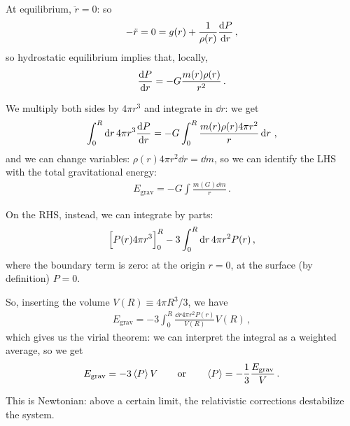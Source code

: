 \documentclass[main.tex]{subfiles}
\begin{document}
At equilibrium, \(\ddot{r} = 0\): so 
%
\begin{align}
  - \ddot{r} = 0 = g(r) + \frac{1}{\rho (r)} \dv{P}{r}
\,,
\end{align}
%
so hydrostatic equilibrium implies that, locally, 
%
\begin{align}
  \dv{P}{r} = - G \frac{m(r) \rho (r)}{r^2}
\,.
\end{align}
%

We multiply both sides by \(4 \pi r^3\) and integrate in \(\dd{r}\): we get 
%
\begin{align}
  \int_0^{R} \dd{r} 4 \pi r^3 \dv{P}{r} = 
  - G \int_{0}^{R} \frac{m(r) \rho (r) 4 \pi r^2}{r} \dd{r}
\,,
\end{align}
%
and we can change variables: \(\rho (r) 4 \pi r^2 \dd{r} = \dd{m }\), so we can identify the LHS with the total gravitational energy: 
%
\begin{align}
E _{\text{grav}} = -G \int \frac{m(G) \dd{m}}{r} 
\,. 
\end{align}

On the RHS, instead, we can integrate by parts: 
%
\begin{align}
  \qty[P(r) 4 \pi r^3]_0^{R} - 3 \int_{0}^{R} \dd{r} 4 \pi r^2 P(r)
\,,
\end{align}
%
where the boundary term is zero: at the origin \(r =0\), at the surface (by definition) \(P =0\).

So, inserting the volume \(V(R) \equiv 4 \pi R^3/3\), we have 
%
\begin{align}
  E _{\text{grav}} = - 3 \int_{0}^{R} \frac{ \dd{r} 4 \pi r^2   P(r)}{V(R)} V(R)
\,,
\end{align}
%
which gives us the virial theorem: we can interpret the integral as a weighted average, so we get 
%
\begin{align}
  E _{\text{grav}} = - 3 \expval{P} V 
  \qquad 
  \text{or} 
  \qquad 
  \expval{P} = -\frac{1}{3} \frac{E _{\text{grav}}}{V}
\,.
\end{align}

This is Newtonian: above a certain limit, the relativistic corrections destabilize the system. 
\end{document}
